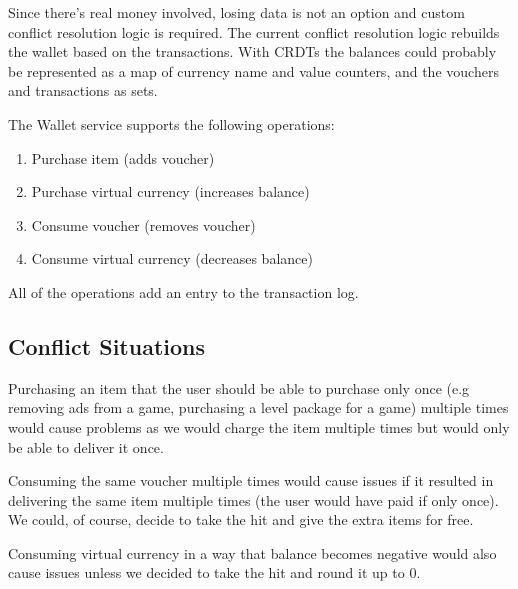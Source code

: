 \documentclass[11pt,a4paper]{report}
\begin{document}
Since there's real money involved, losing data is not an option and custom conflict resolution logic is required. The current conflict resolution logic rebuilds the wallet based on the transactions. With CRDTs the balances could probably be represented as a map of currency name and value counters, and the vouchers and transactions as sets.

The Wallet service supports the following operations:
\begin{enumerate}
\item Purchase item (adds voucher)
\item Purchase virtual currency (increases balance)
\item Consume voucher (removes voucher)
\item Consume virtual currency (decreases balance)
\end{enumerate}
All of the operations add an entry to the transaction log.

\subsection{Conflict Situations}
Purchasing an item that the user should be able to purchase only once (e.g removing ads from a game, purchasing a level package for a game) multiple times would cause problems as we would charge the item multiple times but would only be able to deliver it once.

Consuming the same voucher multiple times would cause issues if it resulted in delivering the same item multiple times (the user would have paid if only once). We could, of course, decide to take the hit and give the extra items for free.

Consuming virtual currency in a way that balance becomes negative would also cause issues unless we decided to take the hit and round it up to 0.
\end{document}
